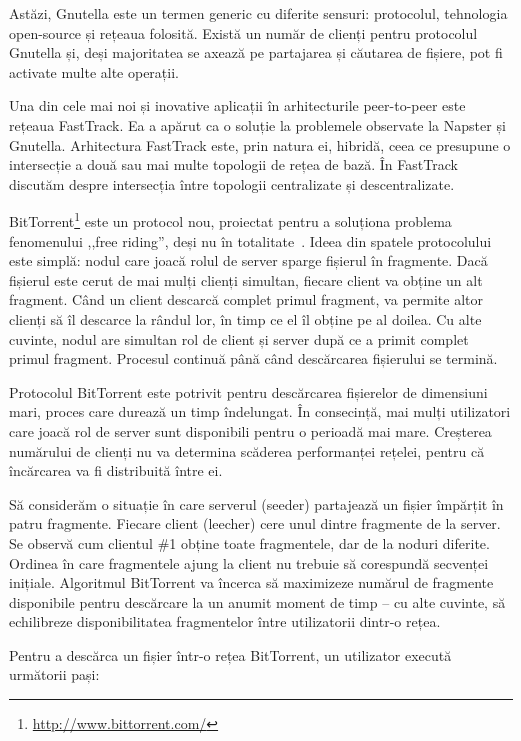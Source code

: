 Astăzi, Gnutella este un termen generic cu diferite sensuri: protocolul,
tehnologia open-source și rețeaua folosită. Există un număr de clienți pentru
protocolul Gnutella și, deși majoritatea se axează pe partajarea și
căutarea de fișiere, pot fi activate multe alte operații.

Una din cele mai noi și inovative aplicații în arhitecturile peer-to-peer este
rețeaua FastTrack. Ea a apărut ca o soluție la problemele observate la Napster
și Gnutella. Arhitectura FastTrack este, prin natura ei, hibridă, ceea ce
presupune o intersecție a două sau mai multe topologii de rețea de bază. În
FastTrack discutăm despre intersecția între topologii centralizate și
descentralizate.

BitTorrent\footnote{\url{http://www.bittorrent.com/}} este un protocol nou,
proiectat pentru a soluționa problema fenomenului ,,free riding'', deși nu
în totalitate~\cite{free-riding}. Ideea din spatele protocolului este simplă:
nodul care joacă rolul de server sparge fișierul în fragmente. Dacă fișierul
este cerut de mai mulți clienți simultan, fiecare client va obține un
alt fragment. Când un client descarcă complet primul fragment, va permite
altor clienți să îl descarce la rândul lor, în timp ce el îl obține pe al
doilea. Cu alte cuvinte, nodul are simultan rol de client și server după ce
a primit complet primul fragment. Procesul continuă până când descărcarea
fișierului se termină.

Protocolul BitTorrent este potrivit pentru descărcarea fișierelor de dimensiuni
mari, proces care durează un timp îndelungat. În consecință, mai mulți
utilizatori care joacă rol de server sunt disponibili pentru o perioadă mai
mare. Creșterea numărului de clienți nu va determina scăderea performanței
rețelei, pentru că încărcarea va fi distribuită între ei.

Să considerăm o situație în care serverul (seeder) partajează un fișier
împărțit în patru fragmente. Fiecare client (leecher) cere unul dintre
fragmente de la server. Se observă cum clientul \#1 obține toate fragmentele,
dar de la noduri diferite. Ordinea în care fragmentele ajung la client nu
trebuie să corespundă secvenței inițiale. Algoritmul BitTorrent va încerca
să maximizeze numărul de fragmente disponibile pentru descărcare la un anumit
moment de timp -- cu alte cuvinte, să echilibreze disponibilitatea fragmentelor
între utilizatorii dintr-o rețea.

Pentru a descărca un fișier într-o rețea BitTorrent, un utilizator execută
următorii pași:

